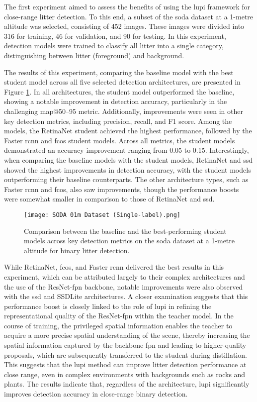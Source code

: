 The first experiment aimed to assess the benefits of using the \gls{lupi} framework for close-range litter detection. To this end, a subset of the \gls{soda} dataset at a 1-metre altitude was selected, consisting of 452 images. These images were divided into 316 for training, 46 for validation, and 90 for testing. In this experiment, detection models were trained to classify all litter into a single category, distinguishing between litter (foreground) and background.

The results of this experiment, comparing the baseline model with the best student model across all five selected detection architectures, are presented in Figure \ref{fig:soda01m_bar}. In all architectures, the student model outperformed the baseline, showing a notable improvement in detection accuracy, particularly in the challenging \gls{map}@50–95 metric. Additionally, improvements were seen in other key detection metrics, including precision, recall, and F1 score. Among the models, the RetinaNet student achieved the highest performance, followed by the Faster \gls{rcnn} and \gls{fcos} student models. Across all metrics, the student models demonstrated an accuracy improvement ranging from 0.05 to 0.15. Interestingly, when comparing the baseline models with the student models, RetinaNet and \gls{ssd} showed the highest improvements in detection accuracy, with the student models outperforming their baseline counterparts. The other architecture types, such as Faster \gls{rcnn} and \gls{fcos}, also saw improvements, though the performance boosts were somewhat smaller in comparison to those of RetinaNet and \gls{ssd}.

\begin{figure}[!ht]
    \centering
    \texttt{[image: SODA 01m Dataset (Single-label).png]}
    \caption{Comparison between the baseline and the best-performing student models across key detection metrics on the \gls{soda} dataset at a 1-metre altitude for binary litter detection.}
    \label{fig:soda01m_bar}
\end{figure}

While RetinaNet, \gls{fcos}, and Faster \gls{rcnn} delivered the best results in this experiment, which can be attributed largely to their complex architectures and the use of the ResNet-\gls{fpn} backbone, notable improvements were also observed with the \gls{ssd} and SSDLite architectures. A closer examination suggests that this performance boost is closely linked to the role of \gls{lupi} in refining the representational quality of the ResNet-\gls{fpn} within the teacher model. In the course of training, the privileged spatial information enables the teacher to acquire a more precise spatial understanding of the scene, thereby increasing the spatial information captured by the backbone \gls{fpn} and leading to higher-quality proposals, which are subsequently transferred to the student during distillation. This suggests that the \gls{lupi} method can improve litter detection performance at close range, even in complex environments with backgrounds such as rocks and plants. The results indicate that, regardless of the architecture, \gls{lupi} significantly improves detection accuracy in close-range binary detection.

